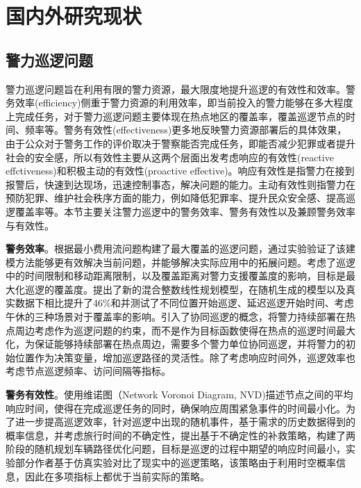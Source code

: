 \documentclass[finalformat,mathCMR]{HUSTthesis}
\begin{document}
\chapter{国内外研究现状}

\section{警力巡逻问题}

警力巡逻问题旨在利用有限的警力资源，最大限度地提升巡逻的有效性和效率\citep{halfordBetterUnderstandingDemand2017}。警务效率(efficiency)侧重于警力资源的利用效率，即当前投入的警力能够在多大程度上完成任务，对于警力巡逻问题主要体现在热点地区的覆盖率，覆盖巡逻节点的时间、频率等。警务有效性(effectiveness)更多地反映警力资源部署后的具体效果，由于公众对于警务工作的评价取决于警察能否完成任务\citep{fieldingReassurancePolicingCommunity2006}，即能否减少犯罪或者提升社会的安全感，所以有效性主要从这两个层面出发考虑响应的有效性(reactive effctiveness)和积极主动的有效性(proactive effective)\citep{chenevoyDeterminingOptimalPolice2022}。响应有效性是指警力在接到报警后，快速到达现场，迅速控制事态，解决问题的能力。主动有效性则指警力在预防犯罪、维护社会秩序方面的能力，例如降低犯罪率、提升民众安全感、提高巡逻覆盖率等。本节主要关注警力巡逻中的警务效率、警务有效性以及兼顾警务效率与有效性。

\textbf{警务效率}。\citep{dewilMinimumCostNetwork2015a}根据最小费用流问题构建了最大覆盖的巡逻问题，通过实验验证了该建模方法能够更有效解决当前问题，并能够解决实际应用中的拓展问题。\citep{auadLocationcoverageModelsPreventing2017a}考虑了巡逻中的时间限制和移动距离限制，以及覆盖距离对警力支援覆盖度的影响，目标是最大化巡逻的覆盖度。\citep{caparImprovedFormulationMaximum2015}提出了新的混合整数线性规划模型，在随机生成的模型以及真实数据下相比\citep{keskinAnalysisIntegratedMaximum2012}提升了46\%和并测试了不同位置开始巡逻、延迟巡逻开始时间、考虑午休的三种场景对于覆盖率的影响。\citep{luoHotSpotCoverage2023a}引入了协同巡逻的概念，将警力持续部署在热点周边考虑作为巡逻问题的约束，而不是作为目标函数使得在热点的巡逻时间最大化，为保证能够持续部署在热点周边，需要多个警力单位协同巡逻，并将警力的初始位置作为决策变量，增加巡逻路径的灵活性。除了考虑响应时间外，巡逻效率也考虑节点巡逻频率、访问间隔等指标\citep{chenDESIGNINGDAILYPATROL2015, guoBalancingEfficiencyUnpredictability2023, katoleBalancingPrioritiesPatrolling2023, liuMultirobotPathPlanning2024}。

\textbf{警务有效性}。\citep{takamiyaPlanningHighResponsive2011}使用维诺图（Network Voronoi Diagram, NVD)描述节点之间的平均响应时间，使得在完成巡逻任务的同时，确保响应周围紧急事件的时间最小化。为了进一步提高巡逻效率，针对巡逻中出现的随机事件，\citep{saint-guillainTimedependentStochasticVehicle2021}基于需求的历史数据得到的概率信息，并考虑旅行时间的不确定性，提出基于不确定性的补救策略，构建了两阶段的随机规划车辆路径优化问题，目标是巡逻的过程中期望的响应时间最小，实验部分作者基于仿真实验对比了现实中的巡逻策略，该策略由于利用时空概率信息，因此在多项指标上都优于当前实际的策略。
\end{document}
